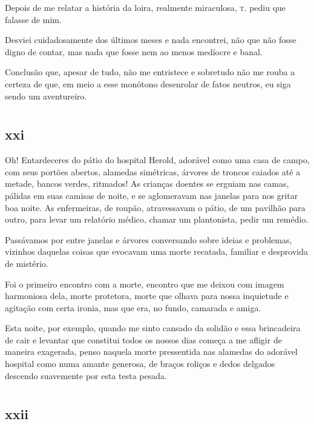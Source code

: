\asterisc

Depois de me relatar a história da loira, realmente miraculosa,
\textsc{t.} pediu que falasse de mim.

Desviei cuidadosamente dos últimos meses e nada encontrei, não que não
fosse digno de contar, mas nada que fosse nem ao menos medíocre e banal.

Conclusão que, apesar de tudo, não me entristece e sobretudo não me
rouba a certeza de que, em meio a esse monótono desenrolar de fatos
neutros, eu siga sendo um aventureiro.

\chapter*{}
\section{xxi}

\noindent{}Oh! Entardeceres do pátio do hospital Herold, adorável como uma casa de
campo, com seus portões abertos, alamedas simétricas, árvores de troncos
caiados até a metade, bancos verdes, ritmados! As crianças doentes se
erguiam nas camas, pálidas em suas camisas de noite, e se aglomeravam
nas janelas para nos gritar boa noite. As enfermeiras, de roupão,
atravessavam o pátio, de um pavilhão para outro, para levar um relatório
médico, chamar um plantonista, pedir um remédio.

Passávamos por entre janelas e árvores conversando sobre ideias e
problemas, vizinhos daquelas coisas que evocavam uma morte recatada,
familiar e desprovida de mistério.

Foi o primeiro encontro com a morte, encontro que me deixou com
imagem harmoniosa dela, morte protetora, morte que olhava para nossa
inquietude e agitação com certa ironia, mas que era, no fundo, camarada
e amiga.

Esta noite, por exemplo, quando me sinto cansado da solidão e
essa brincadeira de cair e levantar que constitui todos os
nossos dias começa a me afligir de maneira exagerada, penso naquela
morte pressentida nas alamedas do adorável hospital como numa amante
generosa, de braços roliços e dedos delgados descendo suavemente por
esta testa pesada.


\chapter*{}
\section{xxii}

